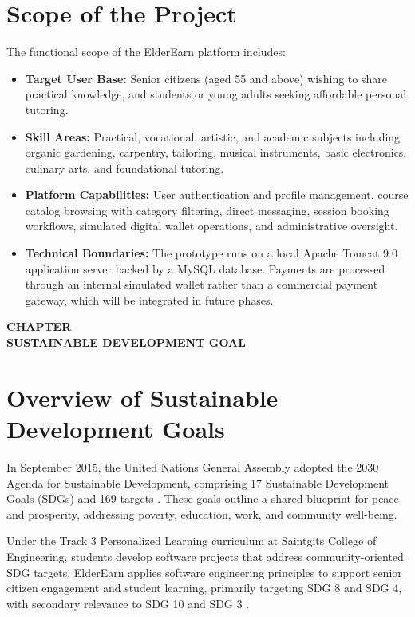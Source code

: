\documentclass[12pt,a4paper]{report}
\newcommand{\chaptertitlepage}[1]{%
  \clearpage
  \thispagestyle{empty}
  \null
  \vfill
  \begin{center}
    {\fontsize{16pt}{18pt}\selectfont\bfseries CHAPTER \thechapter}\\[0.5cm]
    {\fontsize{16pt}{18pt}\selectfont\bfseries #1}
  \end{center}
  \vfill
  \null
  \clearpage
  \setcounter{section}{0}
}
\begin{document}
\section{Scope of the Project}
The functional scope of the ElderEarn platform includes:
\begin{itemize}[leftmargin=1.5em, itemsep=2pt]
  \item \textbf{Target User Base:} Senior citizens (aged 55 and above) wishing to share practical knowledge, and students or young adults seeking affordable personal tutoring.
  \item \textbf{Skill Areas:} Practical, vocational, artistic, and academic subjects including organic gardening, carpentry, tailoring, musical instruments, basic electronics, culinary arts, and foundational tutoring.
  \item \textbf{Platform Capabilities:} User authentication and profile management, course catalog browsing with category filtering, direct messaging, session booking workflows, simulated digital wallet operations, and administrative oversight.
  \item \textbf{Technical Boundaries:} The prototype runs on a local Apache Tomcat 9.0 application server backed by a MySQL database. Payments are processed through an internal simulated wallet rather than a commercial payment gateway, which will be integrated in future phases.
\end{itemize}

\chaptertitlepage{SUSTAINABLE DEVELOPMENT GOAL}

\section{Overview of Sustainable Development Goals}
In September 2015, the United Nations General Assembly adopted the 2030 Agenda for Sustainable Development, comprising 17 Sustainable Development Goals (SDGs) and 169 targets \cite{unsdg}. These goals outline a shared blueprint for peace and prosperity, addressing poverty, education, work, and community well-being.

Under the Track 3 Personalized Learning curriculum at Saintgits College of Engineering, students develop software projects that address community-oriented SDG targets. ElderEarn applies software engineering principles to support senior citizen engagement and student learning, primarily targeting SDG 8 and SDG 4, with secondary relevance to SDG 10 and SDG 3 \cite{whoaging}.
\end{document}
